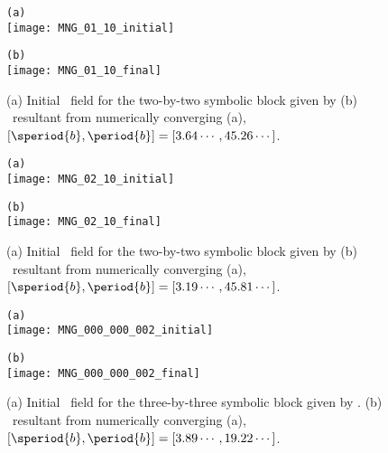 \begin{figure}
\begin{minipage}[height=.4\textheight]{.45\textwidth}
\centering \small{\texttt{(a)}}\\
\texttt{[image: MNG\_01\_10\_initial]}
\end{minipage}
\begin{minipage}[height=.4\textheight]{.45\textwidth}
\centering \small{\texttt{(b)}}\\
\texttt{[image: MNG\_01\_10\_final]}
\end{minipage}
\caption{ \label{fig:block0110}
(a) Initial \spt\ field for the two-by-two symbolic block given by 
(b) \twoT\ resultant from numerically converging (a),
$[\speriod{b},\period{b}]=[3.64\cdots,45.26\cdots]$.
}
\end{figure}

\begin{figure}
\begin{minipage}[height=.4\textheight]{.45\textwidth}
\centering \small{\texttt{(a)}}\\
\texttt{[image: MNG\_02\_10\_initial]}
\end{minipage}
\begin{minipage}[height=.4\textheight]{.45\textwidth}
\centering \small{\texttt{(b)}}\\
\texttt{[image: MNG\_02\_10\_final]}
\end{minipage}
\caption{ \label{fig:block0210}
(a) Initial \spt\ field for the two-by-two symbolic block given by 
(b) \twoT\ resultant from numerically converging (a),
$[\speriod{b},\period{b}]=[3.19\cdots,45.81\cdots]$.
}
\end{figure}

\begin{figure}
\begin{minipage}[height=.4\textheight]{.45\textwidth}
\centering \small{\texttt{(a)}}\\
\texttt{[image: MNG\_000\_000\_002\_initial]}
\end{minipage}
\begin{minipage}[height=.4\textheight]{.45\textwidth}
\centering \small{\texttt{(b)}}\\
\texttt{[image: MNG\_000\_000\_002\_final]}
\end{minipage}
\caption{ \label{fig:block000000002}
(a) Initial \spt\ field for the three-by-three symbolic block given by .
(b) \twoT\ resultant from numerically converging (a),
$[\speriod{b},\period{b}]=[3.89\cdots,19.22\cdots]$.
}
\end{figure}


